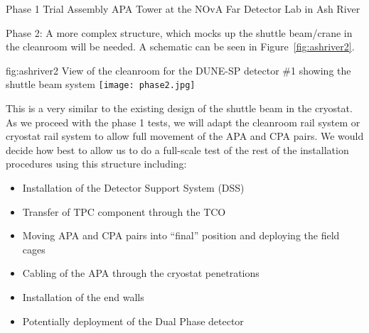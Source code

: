 Phase 1 Trial Assembly APA Tower at the NOvA Far Detector Lab in Ash River

Phase 2: A more complex structure, which mocks up the shuttle
beam/crane in the cleanroom will be needed. A schematic can be seen in
Figure~\ref{fig:ashriver2}.
\begin{dunefigure}{fig:ashriver2}
  {View of the cleanroom for the DUNE-SP detector \#1 showing the shuttle beam system}
  \texttt{[image: phase2.jpg]}
\end{dunefigure}
This is a very similar to the existing
design of the shuttle beam in the cryostat.  As we proceed with the
phase 1 tests, we will adapt the cleanroom rail system or cryostat
rail system to allow full movement of the APA and CPA pairs. We would
decide how best to allow us to do a full-scale test of the rest of the
installation procedures using this structure including:
\begin{itemize}
 \item Installation of the Detector Support System (DSS)
 \item Transfer of TPC component through the TCO
 \item Moving APA and CPA pairs into “final” position and deploying the field cages
 \item Cabling of the APA through the cryostat penetrations
 \item Installation of the end walls
 \item Potentially deployment of the Dual Phase detector
\end{itemize}
